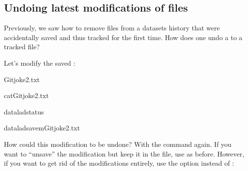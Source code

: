 \subsection{Undoing latest modifications of files}
\label{\detokenize{basics/101-137-history:undoing-latest-modifications-of-files}}
\sphinxAtStartPar
Previously, we saw how to remove files from a datasets history that
were accidentally saved and thus tracked for the first time.
How does one undo a  to a tracked file?

\sphinxAtStartPar
Let’s modify the saved :

\begin{sphinxVerbatim}[commandchars=\\\{\}]
\PYGZgt{}\PYGZgt{}Gitjoke2.txt
\end{sphinxVerbatim}

\begin{sphinxVerbatim}[commandchars=\\\{\}]
catGitjoke2.txt
\end{sphinxVerbatim}

\begin{sphinxVerbatim}[commandchars=\\\{\}]
dataladstatus
\end{sphinxVerbatim}

\begin{sphinxVerbatim}[commandchars=\\\{\}]
dataladsave\PYGZhy{}mGitjoke2.txt
\end{sphinxVerbatim}

\sphinxAtStartPar
How could this modification to  be undone?
With the  command again. If you want to
“unsave” the modification but keep it in the file, use
 as before. However, if you want to
get rid of the modifications entirely, use the option 
instead of :

